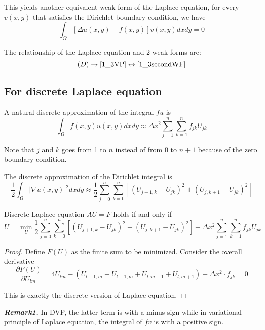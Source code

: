 	This yields another equivalent weak form of the Laplace equation, for every $v(x,y)$ that satisfies the Dirichlet boundary condition, we have 
	\begin{equation}
		\int_{\Omega}[ \Delta u(x,y) - f(x,y) ]v(x,y)dxdy = 0
		\label{1_3secondWF}
	\end{equation}
	
	The relationship of the Laplace equation and 2 weak forms are:$$(D) \rightarrow \eqref{1_3VP} \leftrightarrow \eqref{1_3secondWF}$$
	
	\subsection{For discrete Laplace equation}
	
	A natural discrete approximation of the integral $fu$ is 
	\begin{equation}
		\int_{\Omega}f(x,y)u(x,y)dxdy \approx \Delta x^2 \sum_{j=1}^n\sum_{k=1}^nf_{jk}U_{jk}
	\end{equation}
	
	Note that $j$ and $k$ goes from 1 to $n$ instead of from 0 to $n+1$ because of the zero boundary condition.
	
	The discrete approximation of the Dirichlet integral is 
	\begin{equation}
		\frac{1}{2}\int_{\Omega}| \nabla u(x,y) |^2dxdy \approx \frac{1}{2}\sum_{j=0}^n\sum_{k=0}^n[(U_{j+1,k} - U_{jk})^2 + (U_{j,k+1} - U_{jk})^2]
	\end{equation}
	
	\begin{theorem}
		Discrete Laplace equation $AU = F$ holds if and only if\\
		$$U = \min_{U}\frac{1}{2}\sum_{j=0}^n\sum_{k=0}^n [(U_{j+1,k} - U_{jk})^2 + (U_{j,k+1} - U_{jk})^2] - \Delta x^2 \sum_{j=1}^n\sum_{k=1}^nf_{jk}U_{jk}$$
	\end{theorem}
	
	\begin{proof}
		Define $F(U)$ as the finite sum to be minimized. Consider the overall derivative
		$$\frac{ \partial F(U) }{\partial U_{lm}} = 4U_{lm} - (U_{l-1,m} + U_{l+1,m} + U_{l,m-1} + U_{l,m+1}) - \Delta x^2 \cdot f_{jk} = 0$$
		
		This is exactly the discrete version of Laplace equation.
	\end{proof}
	
	\noindent\textbf{\textit{Remark1.}} In DVP, the latter term is with a minus sign while in variational principle of Laplace equation, the integral of $fv$ is with a positive sign.\\
	
